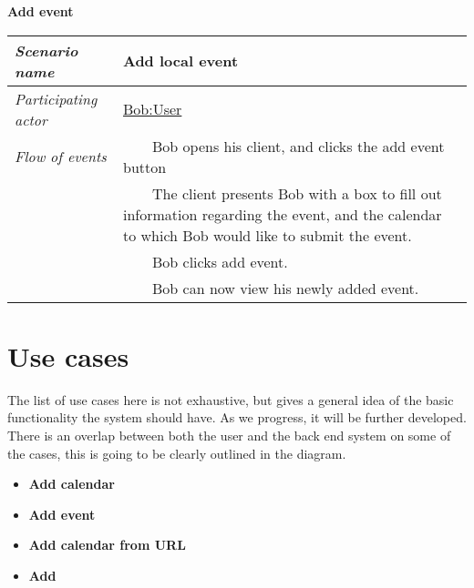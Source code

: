 \documentclass[10pt]{report}
\newcommand{\tabitem}{~~\llap{\textbullet}~~}
\numberwithin{equation}{section} %
\numberwithin{figure}{section} %
\numberwithin{table}{section} %
\begin{document}
\begin{table}[H]
\noindent \textbf{Add event}\\
\begin{tabularx}{\textwidth}{l X}
\midrule
\textit{Scenario name} & Add local event \\ \midrule
\textit{Participating actor} & \underline{Bob:User} \\ \midrule
\textit{Flow of events} & \tabitem Bob opens his client, and clicks the add
                                       event button \\
                                       & \tabitem The client presents Bob with
                                       a box to fill out information regarding
                                       the event, and the calendar to which Bob
                                       would like to submit the event.  \\
                                       & \tabitem Bob clicks add event.  \\
                                       & \tabitem Bob can now view his newly
                                       added event. \\
                                       \midrule
\end{tabularx}
\end{table}

\section{Use cases}
The list of use cases here is not exhaustive, but gives a general idea of the
basic functionality the system should have. As we progress, it will be further
developed. There is an overlap between both the user and the back end system on
some of the cases, this is going to be clearly outlined in the diagram.
\begin{itemize}
\item \textbf{Add calendar}
\item \textbf{Add event}
\item \textbf{Add calendar from URL}
\item \textbf{Add }
\end{itemize}
\end{document}
